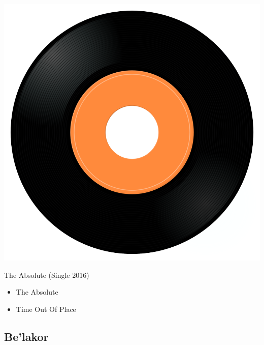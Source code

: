 \begin{minipage}[t]{0.25\textwidth}\vspace{0pt}
\captionsetup{type=figure}
\includegraphics[width=\textwidth]{Images/cover.png}
\caption*{The Absolute (Single 2016)}
\end{minipage}
\begin{minipage}[t]{0.25\textwidth}\vspace{0pt}
\begin{itemize}[nosep,leftmargin=1em,labelwidth=*,align=left]
	\setlength{\itemsep}{0pt}
	\item The Absolute
	\item Time Out Of Place 
\end{itemize}
\end{minipage}

\subsection{Be'lakor}


